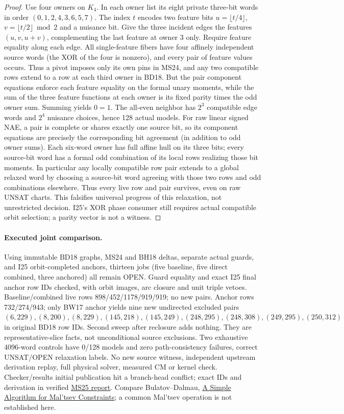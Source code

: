 \documentclass[11pt]{article}
\begin{document}
\begin{proof}
Use four owners on $K_4$. In each owner list its eight private three-bit words in order $(0,1,2,4,3,6,5,7)$. The index $t$ encodes two feature bits $u=\lfloor t/4\rfloor$, $v=\lfloor t/2\rfloor\bmod2$ and a nuisance bit. Give the three incident edges the features $(u,v,u+v)$, complementing the last feature at owner 3 only. Require feature equality along each edge. All single-feature fibers have four affinely independent source words (the XOR of the four is nonzero), and every pair of feature values occurs. Thus a pivot imposes only its own pins in MS24, and any two compatible rows extend to a row at each third owner in BD18. But the pair component equations enforce each feature equality on the formal unary moments, while the sum of the three feature functions at each owner is its fixed parity times the odd owner sum. Summing yields $0=1$. The all-even neighbor has $2^3$ compatible edge words and $2^4$ nuisance choices, hence 128 actual models.
For raw linear signed NAE, a pair is complete or shares exactly one source bit, so its component equations are precisely the corresponding bit agreement (in addition to odd owner sums). Each six-word owner has full affine hull on its three bits; every source-bit word has a formal odd combination of its local rows realizing those bit moments. In particular any locally compatible row pair extends to a global relaxed word by choosing a source-bit word agreeing with those two rows and odd combinations elsewhere. Thus every live row and pair survives, even on raw UNSAT charts. This falsifies universal progress of this relaxation, not unrestricted decision. I25's XOR phase consumer still requires actual compatible orbit selection; a parity vector is not a witness.
\end{proof}
\paragraph{Executed joint comparison.}
Using immutable BD18 graphs, MS24 and BH18 deltas, separate actual guards, and I25 orbit-completed anchors, thirteen jobs (five baseline, five direct combined, three anchored) all remain OPEN. Guard equality and exact I25 final anchor row IDs checked, with orbit images, arc closure and unit triple vetoes. Baseline/combined live rows 898/452/1178/919/919; no new pairs. Anchor rows 732/274/943; only BW17 anchor yields nine new undirected excluded pairs $(6,229),(8,200),(8,229),(145,218),(145,249),(248,295),(248,308),(249,295),(250,312)$ in original BD18 row IDs. Second sweep after reclosure adds nothing. They are representative-slice facts, not unconditional source exclusions. Two exhaustive 4096-word controls have 0/128 models and zero path-consistency failures, correct UNSAT/OPEN relaxation labels. No new source witness, independent upstream derivation replay, full physical solver, measured CM or kernel check. Checker/results initial publication hit a branch-head conflict; exact IDs and derivation in verified \href{https://github.com/j15marti/pnp/commit/6be56eb4c1ec5cdf550f513c27f98ce5b6c6cff8}{MS25 report}. Compare Bulatov--Dalmau, \href{https://doi.org/10.1137/050628957}{A Simple Algorithm for Mal'tsev Constraints}; a common Mal'tsev operation is not established here.
\end{document}
